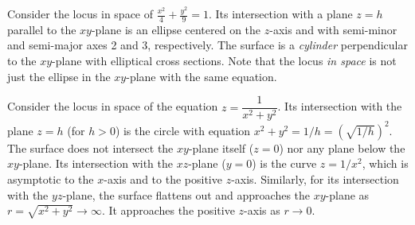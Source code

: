 \begin{example}
	Consider the locus in space of $\displaystyle{\frac{x^2}4 +
	\frac{y^2} 9} = 1$.   Its intersection with a plane $z = h$
	parallel to the $xy$-plane is an ellipse centered on the $z$-axis
	and with semi-minor and semi-major axes  2 and 3, respectively.   The surface
	is a \emph{cylinder} perpendicular to the $xy$-plane with
	elliptical cross sections.
	Note that the locus \emph{in space} is not just the ellipse
	in the $xy$-plane with the same equation.
	
	\begin{center}
	\end{center}
\end{example}

\begin{example}
	Consider the locus in space of the equation
	$z = \dfrac 1{x^2 + y^2}$.   Its intersection with the plane $z = h$
	(for $h > 0$) is the circle with equation
	$ x^2 + y^2 = 1/h = (\sqrt{1/h})^2$.   The surface does not intersect
	the $xy$-plane itself ($z = 0$) nor any plane below the $xy$-plane.
	Its intersection with the $xz$-plane ($y = 0$) is the curve
	$z = 1/x^2$, which is asymptotic to the $x$-axis
	and to the positive $z$-axis.  Similarly, for its intersection
	with the $yz$-plane,   the surface flattens out and approaches the
	$xy$-plane as $r = \sqrt{x^2 + y^2} \to \infty$.  It approaches the
	positive $z$-axis as $r \to 0$.


	\begin{center}
	\end{center}
\end{example}

